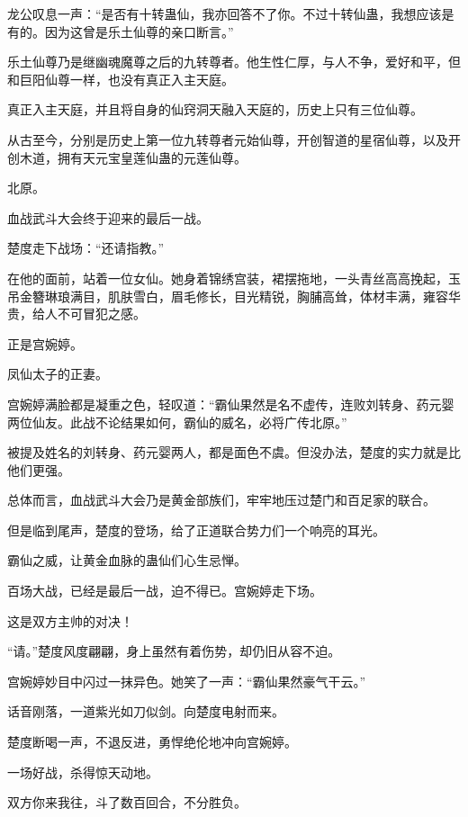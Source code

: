 
\begin{this_body}



龙公叹息一声：“是否有十转蛊仙，我亦回答不了你。不过十转仙蛊，我想应该是有的。因为这曾是乐土仙尊的亲口断言。”

乐土仙尊乃是继幽魂魔尊之后的九转尊者。他生性仁厚，与人不争，爱好和平，但和巨阳仙尊一样，也没有真正入主天庭。

真正入主天庭，并且将自身的仙窍洞天融入天庭的，历史上只有三位仙尊。

从古至今，分别是历史上第一位九转尊者元始仙尊，开创智道的星宿仙尊，以及开创木道，拥有天元宝皇莲仙蛊的元莲仙尊。

北原。

血战武斗大会终于迎来的最后一战。

楚度走下战场：“还请指教。”

在他的面前，站着一位女仙。她身着锦绣宫装，裙摆拖地，一头青丝高高挽起，玉吊金簪琳琅满目，肌肤雪白，眉毛修长，目光精锐，胸脯高耸，体材丰满，雍容华贵，给人不可冒犯之感。

正是宫婉婷。

凤仙太子的正妻。

宫婉婷满脸都是凝重之色，轻叹道：“霸仙果然是名不虚传，连败刘转身、药元婴两位仙友。此战不论结果如何，霸仙的威名，必将广传北原。”

被提及姓名的刘转身、药元婴两人，都是面色不虞。但没办法，楚度的实力就是比他们更强。

总体而言，血战武斗大会乃是黄金部族们，牢牢地压过楚门和百足家的联合。

但是临到尾声，楚度的登场，给了正道联合势力们一个响亮的耳光。

霸仙之威，让黄金血脉的蛊仙们心生忌惮。

百场大战，已经是最后一战，迫不得已。宫婉婷走下场。

这是双方主帅的对决！

“请。”楚度风度翩翩，身上虽然有着伤势，却仍旧从容不迫。

宫婉婷妙目中闪过一抹异色。她笑了一声：“霸仙果然豪气干云。”

话音刚落，一道紫光如刀似剑。向楚度电射而来。

楚度断喝一声，不退反进，勇悍绝伦地冲向宫婉婷。

一场好战，杀得惊天动地。

双方你来我往，斗了数百回合，不分胜负。


\end{this_body}
